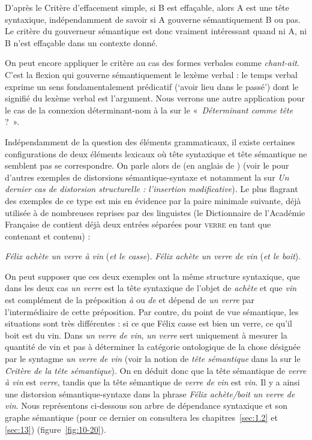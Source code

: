 D’après le Critère d’effacement simple, si B est effaçable, alors A est une tête syntaxique, indépendamment de savoir si A gouverne sémantiquement B ou pas. Le critère du gouverneur sémantique est donc vraiment intéressant quand ni A, ni B n’est effaçable dans un contexte donné.

On peut encore appliquer le critère au cas des formes verbales comme \textit{chant-ait}. C’est la flexion qui gouverne sémantiquement le lexème verbal : le temps verbal exprime un sens fondamentalement prédicatif (‘avoir lieu dans le passé’) dont le signifié du lexème verbal est l’argument. Nous verrons une autre application pour le cas de la connexion déterminant-nom à la  sur le «~\textit{Déterminant comme tête} ?~».

    {Indépendamment de la question des éléments grammaticaux, il existe certaines configurations de deux éléments lexicaux où tête syntaxique et tête sémantique ne semblent pas se correspondre. On parle alors de  (en anglais de ) (voir le  pour d'autres exemples de distorsions sémantique-syntaxe et notamment la  sur \textit{Un dernier cas de distorsion structurelle : l’insertion modificative}). Le plus flagrant des exemples de ce type est mis en évidence par la paire minimale suivante, déjà utilisée à de nombreuses reprises par des linguistes (le Dictionnaire de l’Académie Française de \citeyear{academie1798dictionnaire} contient déjà deux entrées séparées pour \textsc{verre} en tant que contenant et contenu) :

    \ea\label{ex:3-3-24b}
    \ea  \textit{Félix achète un verre à vin} (\textit{et le casse}).
    \ex  \textit{Félix achète un verre de vin} (\textit{et le boit}).
    \z
    \z

    On peut supposer que ces deux exemples ont la même structure syntaxique, que dans les deux cas \textit{un verre} est la tête syntaxique de l’objet de \textit{achète} et que \textit{vin} est complément de la préposition \textit{à} ou \textit{de} et dépend de \textit{un verre} par l’intermédiaire de cette préposition. Par contre, du point de vue sémantique, les situations sont très différentes : si ce que Félix casse est bien un verre, ce qu’il boit est du vin. Dans \textit{un verre de vin}, \textit{un verre} sert uniquement à mesurer la quantité de vin et pas à déterminer la catégorie ontologique de la chose désignée par le syntagme \textit{un verre de vin} (voir la notion de \textit{tête sémantique} dans la  sur le \textit{Critère de la tête sémantique}). On en déduit donc que la tête sémantique de \textit{verre à vin} est \textit{verre}, tandis que la tête sémantique de \textit{verre de vin} est \textit{vin}. Il y a ainsi une distorsion sémantique-syntaxe dans la phrase \textit{Félix achète/boit un verre de vin}. Nous représentons ci-dessous son arbre de dépendance syntaxique et son graphe sémantique (pour ce dernier on consultera les chapitres~\ref{sec:1.2} et \ref{sec:13}) (figure~\ref{fig:10-20}).

}
